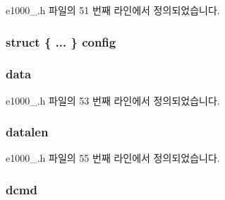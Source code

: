 e1000\+\_.\+h 파일의 51 번째 라인에서 정의되었습니다.

\subsubsection[{\texorpdfstring{config}{config}}]{\setlength{\rightskip}{0pt plus 5cm}struct \{ ... \}   config}\hypertarget{structe1000__adv__data__desc_a0b7ca24bdbcd4f297eb86efd86a5a44b}{}\label{structe1000__adv__data__desc_a0b7ca24bdbcd4f297eb86efd86a5a44b}
\subsubsection[{\texorpdfstring{data}{data}}]{ data}\hypertarget{structe1000__adv__data__desc_a0e5b72ac4f845f11204b39c8fb0f5d91}{}\label{structe1000__adv__data__desc_a0e5b72ac4f845f11204b39c8fb0f5d91}


e1000\+\_.\+h 파일의 53 번째 라인에서 정의되었습니다.

\subsubsection[{\texorpdfstring{datalen}{datalen}}]{ datalen}\hypertarget{structe1000__adv__data__desc_a571688e5f6b283996f703002f97c55bb}{}\label{structe1000__adv__data__desc_a571688e5f6b283996f703002f97c55bb}


e1000\+\_.\+h 파일의 55 번째 라인에서 정의되었습니다.

\subsubsection[{\texorpdfstring{dcmd}{dcmd}}]{ dcmd}\hypertarget{structe1000__adv__data__desc_ae7b0982d6e7103498e28c67d95a6320a}{}\label{structe1000__adv__data__desc_ae7b0982d6e7103498e28c67d95a6320a}


